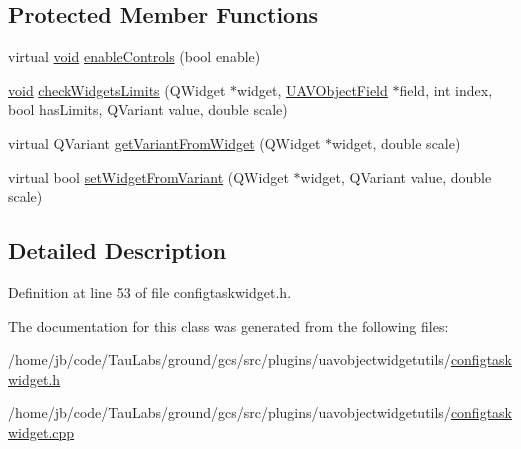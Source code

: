\subsection*{\-Protected \-Member \-Functions}
\begin{DoxyCompactItemize}
\item 
virtual \hyperlink{group___u_a_v_objects_plugin_ga444cf2ff3f0ecbe028adce838d373f5c}{void} \hyperlink{group___u_a_v_object_widget_utils_gaad59e4e96d1e4a59067aa44828ddaa3f}{enable\-Controls} (bool enable)
\item 
\hyperlink{group___u_a_v_objects_plugin_ga444cf2ff3f0ecbe028adce838d373f5c}{void} \hyperlink{group___u_a_v_object_widget_utils_ga087b6f8f17317793efa0d121fe42336a}{check\-Widgets\-Limits} (\-Q\-Widget $\ast$widget, \hyperlink{class_u_a_v_object_field}{\-U\-A\-V\-Object\-Field} $\ast$field, int index, bool has\-Limits, \-Q\-Variant value, double scale)
\item 
virtual \-Q\-Variant \hyperlink{group___u_a_v_object_widget_utils_ga0bc84dd39dc77fccf26bf3a708a11733}{get\-Variant\-From\-Widget} (\-Q\-Widget $\ast$widget, double scale)
\item 
virtual bool \hyperlink{group___u_a_v_object_widget_utils_gac37260311f36d40dcb9dce65e025c426}{set\-Widget\-From\-Variant} (\-Q\-Widget $\ast$widget, \-Q\-Variant value, double scale)
\end{DoxyCompactItemize}


\subsection{\-Detailed \-Description}


\-Definition at line 53 of file configtaskwidget.\-h.



\-The documentation for this class was generated from the following files\-:\begin{DoxyCompactItemize}
\item 
/home/jb/code/\-Tau\-Labs/ground/gcs/src/plugins/uavobjectwidgetutils/\hyperlink{configtaskwidget_8h}{configtaskwidget.\-h}\item 
/home/jb/code/\-Tau\-Labs/ground/gcs/src/plugins/uavobjectwidgetutils/\hyperlink{configtaskwidget_8cpp}{configtaskwidget.\-cpp}\end{DoxyCompactItemize}
